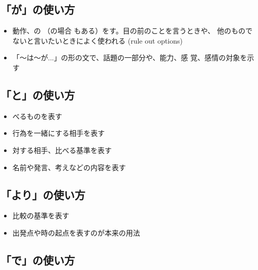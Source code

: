 \documentclass{tufte-handout}
\begin{document}

\subsection{「が」の使い方}%
\label{sub:ga_notsukaikata}

\begin{itemize}
  \item 動作、の
    （の場合
    もある）をす。目の前のことを言うときや、
    他のものでないと言いたいときによく使われる (rule out
    options)
  \item 「〜は〜が...」の形の文で、話題の一部分や、能力、感
    覚、感情の対象を示す
\end{itemize}


\subsection{「と」の使い方}%
\label{sub:to_notsukaikata}

\begin{itemize}
  \item {}べるものを表す
  \item 行為を一緒にする相手を表す
  \item 対する相手、比べる基準を表す
  \item 名前や発言、考えなどの内容を表す
\end{itemize}


\subsection{「より」の使い方}%
\label{sub:yori_notsukaikata}

\begin{itemize}
  \item 比較の基準を表す
  \item 出発点や時の起点を表すのが本来の用法
\end{itemize}


\subsection{「で」の使い方}%
\label{sub:de_notsukaikata}
\end{document}

